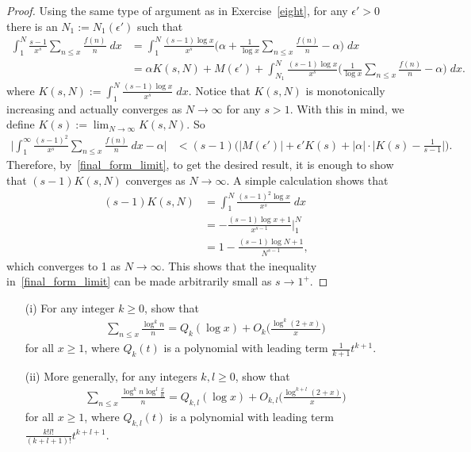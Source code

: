 \documentclass[11pt]{article}
\newenvironment{ex}[1]
  {\renewcommand\theinnercustomthm{#1}\innercustomthm}
  {\endinnercustomthm}
\begin{document}
\begin{proof}
Using the same type of argument as in Exercise~\ref{eight}, for any $\epsilon'>0$ there is an $N_1:=N_1(\epsilon')$ such that
\begin{align*}
\int_1^N\frac{s-1}{x^s}\sum_{n\leq x}\frac{f(n)}{n}\;dx &= \int_1^N\frac{(s-1)\log{x}}{x^s}\bigg(\alpha+\frac{1}{\log{x}}\sum_{n\leq x}\frac{f(n)}{n}-\alpha\bigg)\;dx\\ &= \alpha K(s,N)+M(\epsilon')+\int_{N_1}^N\frac{(s-1)\log{x}}{x^s}\bigg(\frac{1}{\log{x}}\sum_{n\leq x}\frac{f(n)}{n}-\alpha\bigg)\;dx.
\end{align*}
where $K(s,N):=\int_{1}^N\frac{(s-1)\log{x}}{x^s}\;dx$. Notice that $K(s,N)$ is monotonically increasing and actually converges as $N\to\infty$ for any $s>1$. With this in mind, we define $K(s):=\lim_{N\to\infty}K(s,N)$. So
\begin{align}
\bigg|\int_1^\infty\frac{(s-1)^2}{x^s}\sum_{n\leq x}\frac{f(n)}{n}\;dx -\alpha\bigg| &< (s-1)\bigg(|M(\epsilon')|+\epsilon ' K(s)+|\alpha|\cdot\bigg|K(s)-\frac{1}{s-1}\bigg|\bigg).\label{final_form_limit}
\end{align}
Therefore, by~\eqref{final_form_limit}, to get the desired result, it is enough to show that $(s-1)K(s,N)$ converges as $N\to\infty$. A simple calculation shows that
\begin{align*}
(s-1)K(s,N) &=\int_1^N\frac{(s-1)^2\log{x}}{x^s}\;dx\\
&= -\frac{(s-1)\log{x}+1}{x^{s-1}}\bigg|_1^N\\
&= 1-\frac{(s-1)\log{N}+1}{N^{s-1}},
\end{align*}
which converges to 1 as $N\to\infty$. This shows that the inequality in~\eqref{final_form_limit} can be made arbitrarily small as $s\to1^+$.
\end{proof}


\begin{ex}{9}\label{nine}
\begin{enumerate}
\item[(i)] For any integer $k\geq 0$, show that
\begin{align*}
\sum_{n\leq x}\frac{\log^k{n}}{n}=Q_k(\log{x})+O_k\bigg(\frac{\log^k{(2+x)}}{x}\bigg)
\end{align*}
for all $x\geq 1$, where $Q_k(t)$ is a polynomial with leading term $\frac{1}{k+1}t^{k+1}$.
\item[(ii)] More generally, for any integers $k,l\geq0$, show that
\begin{align*}
\sum_{n\leq x}\frac{\log^k{n}\log^l{\frac{x}{n}}}{n}=Q_{k,l}(\log{x})+O_{k,l}\bigg(\frac{\log^{k+l}{(2+x)}}{x}\bigg)
\end{align*}
for all $x\geq 1$, where $Q_{k,l}(t)$ is a polynomial with leading term $\frac{k!l!}{(k+l+1)!}t^{k+l+1}$.
\end{enumerate}
\end{ex}
\end{document}
